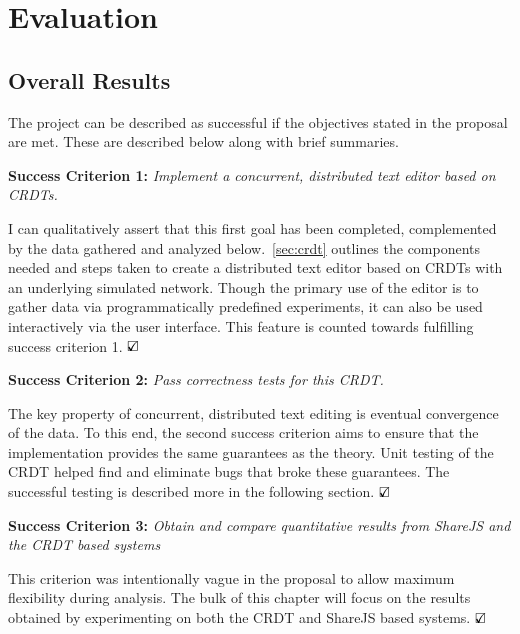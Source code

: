 \documentclass[12pt,a4paper,twoside,openright]{report}
\begin{document}
			
			
			
		


\chapter{Evaluation}

	\section{Overall Results}
	
	The project can be described as successful if the objectives stated in the proposal are met. These are described below along with brief summaries.
	
	\textbf{Success Criterion 1:} \textit{Implement a concurrent, distributed text editor based on CRDTs.}
	
	I can qualitatively assert that this first goal has been completed, complemented by the data gathered and analyzed below.~\cref{sec:crdt} outlines the components needed and steps taken to create a distributed text editor based on CRDTs with an underlying simulated network. Though the primary use of the editor is to gather data via programmatically predefined experiments, it can also be used interactively via the user interface. This feature is counted towards fulfilling success criterion 1.  $\text{\rlap{$\checkmark$}}\square$
	
	\textbf{Success Criterion 2:} \textit{Pass correctness tests for this CRDT.}
	
	The key property of concurrent, distributed text editing is eventual convergence of the data. To this end, the second success criterion aims to ensure that the implementation provides the same guarantees as the theory. Unit testing of the CRDT helped find and eliminate bugs that broke these guarantees. The successful testing is described more in the following section. $\text{\rlap{$\checkmark$}}\square$
	

	\textbf{Success Criterion 3:} \textit{Obtain and compare quantitative results from ShareJS and the CRDT based systems}
	
	This criterion was intentionally vague in the proposal to allow maximum flexibility during analysis. The bulk of this chapter will focus on the results obtained by experimenting on both the CRDT and ShareJS based systems.	$\text{\rlap{$\checkmark$}}\square$
	
\end{document}
